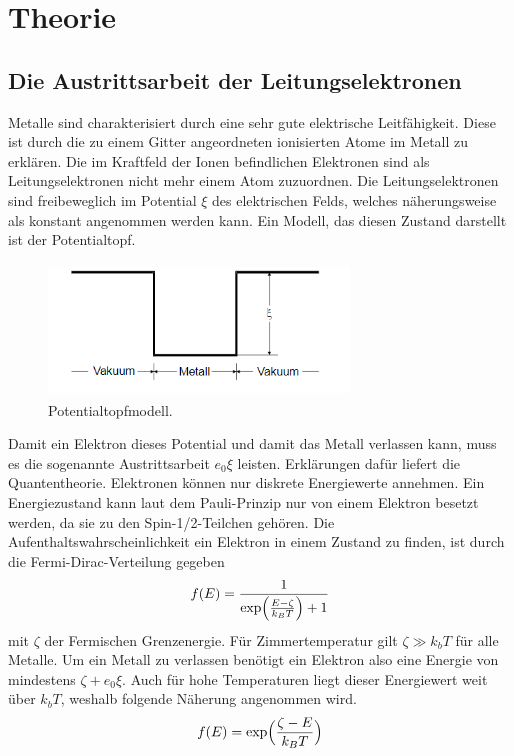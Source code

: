 \section{Theorie}
\label{sec:Theorie}
\subsection{Die Austrittsarbeit der Leitungselektronen}
Metalle sind charakterisiert durch eine sehr gute elektrische Leitfähigkeit. Diese ist
durch die zu einem Gitter angeordneten ionisierten Atome im Metall zu erklären. Die
im Kraftfeld der Ionen befindlichen Elektronen sind als Leitungselektronen nicht mehr
einem Atom zuzuordnen. Die Leitungselektronen sind freibeweglich im Potential $\xi$ des
elektrischen Felds, welches näherungsweise als konstant angenommen werden kann. Ein
Modell, das diesen Zustand darstellt ist der Potentialtopf.
\begin{figure}[H]
    \begin{center}
    \includegraphics[width = 8cm, height= 3.5cm]{Potentialtopf.png}
    \caption{Potentialtopfmodell.\protect\cite{AL}}
    \end{center}
    \label{fig:Potentialtopf}
    \end{figure}
    \noindent
Damit ein Elektron dieses Potential und damit das Metall verlassen kann, muss es
die sogenannte Austrittsarbeit $e_0 \xi$ leisten. Erklärungen dafür liefert die Quantentheorie.
Elektronen können nur diskrete Energiewerte annehmen. Ein Energiezustand kann laut
dem Pauli-Prinzip nur von einem Elektron besetzt werden, da sie zu den Spin-1/2-Teilchen
gehören. Die Aufenthaltswahrscheinlichkeit ein Elektron in einem Zustand zu finden, ist
durch die Fermi-Dirac-Verteilung gegeben
\begin{equation}
   f(E)=\frac{1}{\text{exp}\Bigl(\frac{E-\zeta}{k_B T}\Bigr)+1}\\
   \end{equation}
\noindent mit $\zeta$ der Fermischen Grenzenergie. Für Zimmertemperatur gilt $\zeta \gg k_b T$ für alle Metalle.
Um ein Metall zu verlassen benötigt ein Elektron also eine Energie von mindestens $\zeta +e_0 \xi$.
Auch für hohe Temperaturen liegt dieser Energiewert weit über $k_bT$, weshalb folgende
Näherung angenommen wird.
\begin{equation}
    f(E)=\text{exp}\Bigl(\frac{\zeta - E}{k_B T}\Bigr)\\
    \end{equation}
